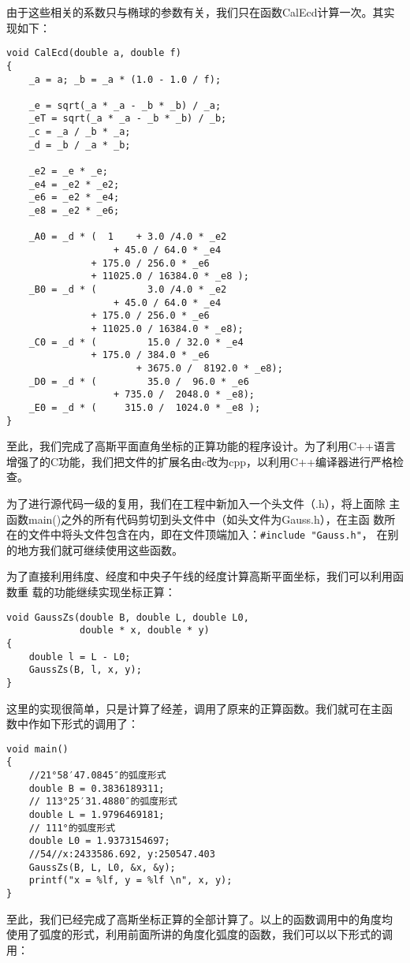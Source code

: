 由于这些相关的系数只与椭球的参数有关，我们只在函数CalEcd计算一次。其实
现如下：
\begin{verbatim}
void CalEcd(double a, double f)
{
    _a = a; _b = _a * (1.0 - 1.0 / f);

    _e = sqrt(_a * _a - _b * _b) / _a;
    _eT = sqrt(_a * _a - _b * _b) / _b;
    _c = _a / _b * _a;
    _d = _b / _a * _b;

    _e2 = _e * _e;
    _e4 = _e2 * _e2;
    _e6 = _e2 * _e4;
    _e8 = _e2 * _e6;

    _A0 = _d * (  1    + 3.0 /4.0 * _e2
                   + 45.0 / 64.0 * _e4
               + 175.0 / 256.0 * _e6
               + 11025.0 / 16384.0 * _e8 );
    _B0 = _d * (         3.0 /4.0 * _e2
                   + 45.0 / 64.0 * _e4
               + 175.0 / 256.0 * _e6
               + 11025.0 / 16384.0 * _e8);
    _C0 = _d * (         15.0 / 32.0 * _e4
               + 175.0 / 384.0 * _e6
                       + 3675.0 /  8192.0 * _e8);
    _D0 = _d * (         35.0 /  96.0 * _e6
                   + 735.0 /  2048.0 * _e8);
    _E0 = _d * (     315.0 /  1024.0 * _e8 );
}
\end{verbatim}

至此，我们完成了高斯平面直角坐标的正算功能的程序设计。为了利用C++语言
增强了的C功能，我们把文件的扩展名由c改为cpp，以利用C++编译器进行严格检
查。

为了进行源代码一级的复用，我们在工程中新加入一个头文件（.h），将上面除
主函数main()之外的所有代码剪切到头文件中（如头文件为Gauss.h），在主函
数所在的文件中将头文件包含在内，即在文件顶端加入：\verb|#include "Gauss.h"|，
在别的地方我们就可继续使用这些函数。

为了直接利用纬度、经度和中央子午线的经度计算高斯平面坐标，我们可以利用函数重
载的功能继续实现坐标正算：

\begin{verbatim}
void GaussZs(double B, double L, double L0,
             double * x, double * y)
{
    double l = L - L0;
    GaussZs(B, l, x, y);
}
\end{verbatim}

这里的实现很简单，只是计算了经差，调用了原来的正算函数。我们就可在主函
数中作如下形式的调用了：

\begin{verbatim}
void main()
{
    //21°58′47.0845″的弧度形式
    double B = 0.3836189311;
    // 113°25′31.4880″的弧度形式
    double L = 1.9796469181;
    // 111°的弧度形式
    double L0 = 1.9373154697;
    //54//x:2433586.692, y:250547.403
    GaussZs(B, L, L0, &x, &y);
    printf("x = %lf, y = %lf \n", x, y);
}
\end{verbatim}
至此，我们已经完成了高斯坐标正算的全部计算了。以上的函数调用中的角度均
使用了弧度的形式，利用前面所讲的角度化弧度的函数，我们可以以下形式的调
用：


